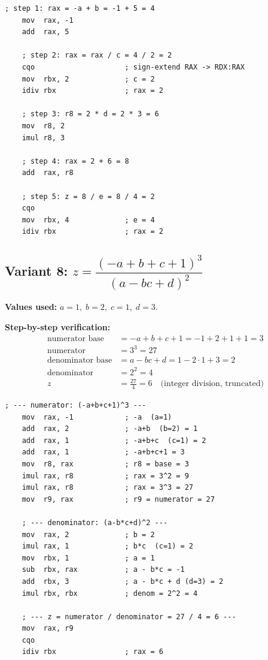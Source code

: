 \documentclass[12pt,a4paper]{article}
\begin{document}
\begin{lstlisting}[caption={Variant 13 --- key assembly steps}]
    ; step 1: rax = -a + b = -1 + 5 = 4
    mov  rax, -1
    add  rax, 5

    ; step 2: rax = rax / c = 4 / 2 = 2
    cqo                     ; sign-extend RAX -> RDX:RAX
    mov  rbx, 2             ; c = 2
    idiv rbx                ; rax = 2

    ; step 3: r8 = 2 * d = 2 * 3 = 6
    mov  r8, 2
    imul r8, 3

    ; step 4: rax = 2 + 6 = 8
    add  rax, r8

    ; step 5: z = 8 / e = 8 / 4 = 2
    cqo
    mov  rbx, 4             ; e = 4
    idiv rbx                ; rax = 2
\end{lstlisting}

\newpage

\subsection{Variant 8: $z = \dfrac{(-a+b+c+1)^3}{(a-bc+d)^2}$}

\textbf{Values used:} $a=1,\; b=2,\; c=1,\; d=3$.

\textbf{Step-by-step verification:}
\begin{align*}
  \text{numerator base} &= -a + b + c + 1 = -1 + 2 + 1 + 1 = 3 \\
  \text{numerator} &= 3^3 = 27 \\
  \text{denominator base} &= a - bc + d = 1 - 2 \cdot 1 + 3 = 2 \\
  \text{denominator} &= 2^2 = 4 \\
  z &= \frac{27}{4} = \boxed{6} \quad \text{(integer division, truncated)}
\end{align*}

\begin{lstlisting}[caption={Variant 8 --- key assembly steps}]
    ; --- numerator: (-a+b+c+1)^3 ---
    mov  rax, -1            ; -a  (a=1)
    add  rax, 2             ; -a+b  (b=2) = 1
    add  rax, 1             ; -a+b+c  (c=1) = 2
    add  rax, 1             ; -a+b+c+1 = 3
    mov  r8, rax            ; r8 = base = 3
    imul rax, r8            ; rax = 3^2 = 9
    imul rax, r8            ; rax = 3^3 = 27
    mov  r9, rax            ; r9 = numerator = 27

    ; --- denominator: (a-b*c+d)^2 ---
    mov  rax, 2             ; b = 2
    imul rax, 1             ; b*c  (c=1) = 2
    mov  rbx, 1             ; a = 1
    sub  rbx, rax           ; a - b*c = -1
    add  rbx, 3             ; a - b*c + d (d=3) = 2
    imul rbx, rbx           ; denom = 2^2 = 4

    ; --- z = numerator / denominator = 27 / 4 = 6 ---
    mov  rax, r9
    cqo
    idiv rbx                ; rax = 6
\end{lstlisting}
\end{document}
